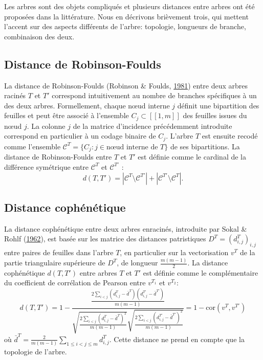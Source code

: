 \documentclass[12pt,a4paper]{reedthesis}
\theoremstyle{definition}
\theoremstyle{definition}
\theoremstyle{definition}
\theoremstyle{remark}
\begin{document}
Les arbres sont des objets compliqués et plusieurs distances entre arbres ont été proposées dans la littérature. Nous en décrivons brièvement trois, qui mettent l'accent sur des aspects différents de l'arbre: topologie, longueurs de branche, combinaison des deux.

\hypertarget{distance-de-robinson-foulds}{%
\subsection{Distance de Robinson-Foulds}\label{distance-de-robinson-foulds}}

La distance de Robinson-Foulds (Robinson \& Foulds, \protect\hyperlink{ref-robinson1981comparison}{1981}) entre deux arbres racinés \(T\) et \(T'\) correspond intuitivement au nombre de branches spécifiques à un des deux arbres. Formellement, chaque nœud interne \(j\) définit une bipartition des feuilles et peut être associé à l'ensemble \(C_j \subset [\![1,m]\!]\) des feuilles issues du nœud \(j\). La colonne \(j\) de la matrice d'incidence précédemment introduite correspond en particulier à un codage binaire de \(C_j\). L'arbre \(T\) est ensuite recodé comme l'ensemble \(\mathcal{C}^T = \{C_j: j \in \text{nœud interne de } T\}\) de ses bipartitions. La distance de Robinson-Foulds entre \(T\) et \(T'\) est définie comme le cardinal de la différence symétrique entre \(\mathcal{C}^T\) et \(\mathcal{C}^{T'}\) :
\begin{equation*}
d(T, T') = | \mathcal{C}^T \setminus \mathcal{C}^{T'} | + | \mathcal{C}^{T'} \setminus \mathcal{C}^{T} |.
\end{equation*}
\hypertarget{distance-cophuxe9nuxe9tique}{%
\subsection{Distance cophénétique}\label{distance-cophuxe9nuxe9tique}}

La distance cophénétique entre deux arbres enracinés, introduite par Sokal \& Rohlf (\protect\hyperlink{ref-sokal1962comparison}{1962}), est basée sur les matrice des distances patristiques \(D^T = \left(d^T_{i,j}\right)_{i,j}\) entre paires de feuilles dans l'arbre \(T\), en particulier sur la vectorisation \(v^T\) de la partie triangulaire supérieure de \(D^T\), de longueur \(\frac{m(m-1)}{2}\). La distance cophénétique \(d(T, T')\) entre arbres \(T\) et \(T'\) est définie comme le complémentaire du coefficient de corrélation de Pearson entre \(v^{T_1}\) et \(v^{T_2}\):
\begin{equation*}
d(T, T') = 1 - \frac{ \frac{2\sum_{i < j} (d^{T}_{i,j} - \bar{d}^{T})(d^{T'}_{i,j} - \bar{d}^{T'})}{m(m-1)}}{\sqrt{\frac{2\sum_{i < j} (d^{T}_{i,j} - \bar{d}^{T})^2}{m(m-1)}} \sqrt{\frac{2\sum_{i < j} (d^{T'}_{i,j} - \bar{d}^{T'})^2}{m(m-1)}}} = 1 - \text{cor}(v^T, v^{T'})
\end{equation*}
où \(\bar{d}^{T} = \frac{2}{m(m-1)} \sum_{1 \leq i < j \leq m} d^{T}_{i,j}\). Cette distance ne prend en compte que la topologie de l'arbre.
\end{document}
